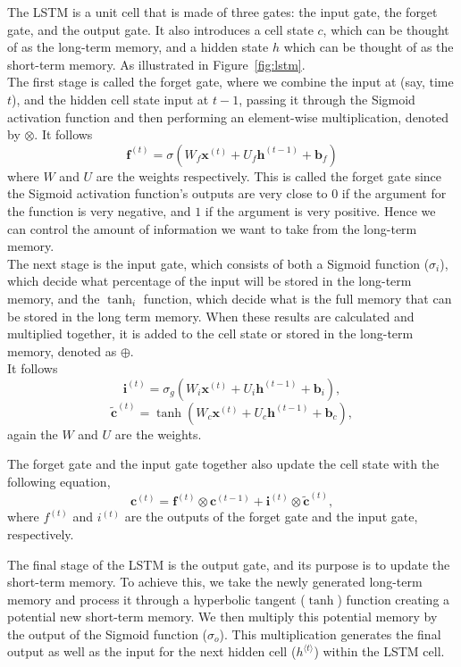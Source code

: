The LSTM is a unit cell that is made of three gates: the input gate, the forget gate, and the output gate. It also introduces a cell state $c$, which can be thought of as the long-term memory, and a hidden state $h$ which can be thought of as the short-term memory. As illustrated in Figure~\ref{fig:lstm}. \\
The first stage is called the forget gate, where we combine the input at (say, time $t$), and the hidden cell state input at $t-1$, passing it through the Sigmoid activation function and then performing an element-wise multiplication, denoted by $\otimes$.
It follows 
\[\mathbf{f}^{(t)} = \sigma(W_f\mathbf{x}^{(t)} + U_f\mathbf{h}^{(t-1)} + \mathbf{b}_f) \]
where $W$ and $U$ are the weights respectively.
This is called the forget gate since the Sigmoid activation function's outputs are very close to $0$ if the argument for the function is very negative, and $1$ if the argument is very positive. Hence we can control the amount of information we want to take from the long-term memory.\\

The next stage is the input gate, which consists of both a Sigmoid function ($\sigma_i$), which decide what percentage of the input will be stored in the long-term memory, and the $\tanh_i$ function, which decide what is the full memory that can be stored in the long term memory. When these results are calculated and multiplied together, it is added to the cell state or stored in the long-term memory, denoted as $\oplus$. \\
It follows
\[\mathbf{i}^{(t)} = \sigma_g(W_i\mathbf{x}^{(t)} + U_i\mathbf{h}^{(t-1)} + \mathbf{b}_i),\]
\[\mathbf{\tilde{c}}^{(t)} = \tanh(W_c\mathbf{x}^{(t)} + U_c\mathbf{h}^{(t-1)} + \mathbf{b}_c),\] again the $W$ and $U$ are the weights.

The forget gate and the input gate together also update the cell state with the following equation, 
\[\mathbf{c}^{(t)} = \mathbf{f}^{(t)} \otimes \mathbf{c}^{(t-1)} + \mathbf{i}^{(t)} \otimes \mathbf{\tilde{c}}^{(t)},\] where $f^{(t)}$ and $i^{(t)}$ are the outputs of the forget gate and the input gate, respectively.

The final stage of the LSTM is the output gate, and  its purpose is to update the short-term memory.  To achieve this, we take the newly generated long-term memory and process it through a hyperbolic tangent ($\tanh$) function creating a potential new short-term memory. We then multiply this potential memory by the output of the Sigmoid function ($\sigma_o$). This multiplication generates the final output as well as the input for the next hidden cell ($h^{\langle t \rangle}$) within the LSTM cell.


